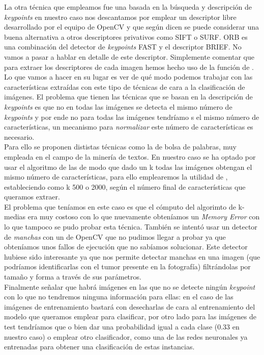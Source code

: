 La otra técnica que empleamos fue una basada en la búsqueda y descripción de \textit{keypoints} en nuestro caso nos descantamos por emplear  un descriptor libre desarrollado por el equipo de OpenCV y que según dicen se puede considerar una buena alternativa a otros descriptores privativos como SIFT o SURF.  ORB es una combinación del detector de \textit{keypoints} FAST y el descriptor BRIEF. No vamos a pasar a hablar en detalle de este descriptor. Simplemente comentar que para extraer los descriptores de cada imagen hemos hecho uso de la función  de .\\

Lo que vamos a hacer en su lugar es ver de qué modo podemos trabajar con las características extraídas con este tipo de técnicas de cara a la clasificación de imágenes. El problema que tienen las técnicas que se basan en la descripción de \textit{keypoints} es que no en todas las imágenes se detecta el mismo número de \textit{keypoints} y por ende no para todas las imágenes tendríamo
s el mismo número de características, un mecanismo para \textit{normalizar} este número de características es necesario.\\

Para ello se proponen dististas técnicas como la de bolsa de palabras, muy empleada en el campo de la minería de textos. En nuestro caso se ha optado por usar el algoritmo de las  de modo que dado un k todas las imágenes obtengan el mismo número de características, para ello emplearemos la utilidad de  , estableciendo como k 500 o 2000, según el número final de características que queramos extraer.\\

El problema que teníamos en este caso es que el cómputo del algorimto de k-medias era muy costoso con lo que nuevamente obteníamos un \textit{Memory Error} con lo que tampoco se pudo probar esta técnica. También se intentó usar un detector de \textit{manchas} con un  de OpenCV que no pudimos llegar a probar ya que obteníamos unos fallos de ejecución que no sabíamos solucionar. Este detector hubiese sido interesante ya que nos permite detectar manchas en una imagen (que podríamos identificarlas con el tumor presente en la fotografía) filtrándolas por tamaño y forma a través de sus parámetros.\\

Finalmente señalar que habrá imágenes en las que no se detecte ningún \textit{keypoint} con lo que no tendremos ninguna información para ellas: en el caso de las imágenes de entrenamiento bastará con desecharlas de cara al entrenamiento del modelo que queramos emplear para clasificar, por otro lado para las imágenes de test tendríamos que o bien dar una probabilidad igual a cada clase (0.33 en nuestro caso) o emplear otro clasificador, como una de las redes neuronales ya entrenadas para obtener una clasificación de estas instancias.